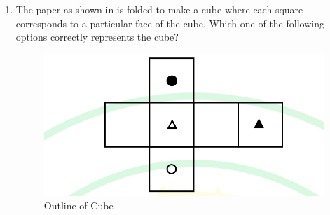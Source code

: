 \documentclass[journal,12pt,onecolumn]{IEEEtran}
\theoremstyle{remark}
\begin{document}
\begin{enumerate}
\item The paper as shown in  is folded to make a cube where each square corresponds to a particular face of the cube. Which one of the following options correctly represents the cube?
\par\hfill{}
\begin{figure}[H]
\centering
\includegraphics[width=0.4\columnwidth]{Figs/Q-4.jpg}
\caption{Outline of Cube}
\label{4}
\end{figure}
\begin{enumerate}
\end{enumerate}
\end{enumerate}
\end{document}
